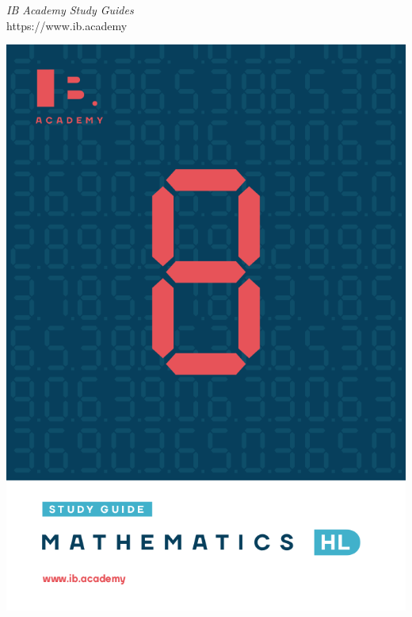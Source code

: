     \vfill
    \begin{minipage}{0.6\linewidth}\raggedright\Large
            \textit{IB Academy Study Guides}\\
            https://www.ib.academy
        \end{minipage}\begin{minipage}{0.4\linewidth}\raggedleft
            \includegraphics[width=\linewidth]{./FullPages/ibacademy}
    \end{minipage}

    \vfill
    \null



